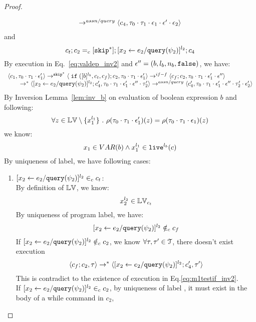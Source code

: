 {\begin{proof}
\begin{subproof}
\[\begin{array}{l}
  \rightarrow^{assn/query} 
  \langle {c}_4,  \mathtt{\tau}_0 \cdot \mathtt{\tau}_1 \cdot \mathtt{\epsilon}_1 \cdot \mathtt{\epsilon}' \cdot \mathtt{\epsilon}_2 \rangle 
  \end{array}
\]
and 
\[
  c_t;c_2 =_c [\mathtt{skip}^*]; [\mathrel{ {x}_2 \leftarrow e_2 / {\tt query}(\psi_2) }]^{l_2};{c}_4
\]
%
By execution in Eq.~\ref{eq:valdep_inv2} and $\mathtt{\epsilon}'' = (b, l_b, n_b, \mathtt{false})$, we have:
\begin{equation}
\label{eq:m1testif_inv2}
  \begin{array}{l}   
  \langle c_1, \mathtt{\tau}_0 \cdot \mathtt{\tau}_1 \cdot \mathtt{\epsilon}_1' \rangle 
  \rightarrow^{\mathtt{skip}^*} 
  \langle \;\mathtt{if}\; ([b]^{l_b}, c_t, c_f); {c}_2, \mathtt{\tau}_0 \cdot \mathtt{\tau}_1 \cdot \mathtt{\epsilon}_1' \rangle 
  \rightarrow^{if-f} 
  \langle c_f;c_2, \mathtt{\tau}_0 \cdot \mathtt{\tau}_1 \cdot \mathtt{\epsilon}_1' \cdot \mathtt{\epsilon}'' \rangle 
  \\
  \qquad \rightarrow^{*} 
  \langle [\mathrel{ {x}_2 \leftarrow e_2 / {\tt query}(\psi_2) }]^{l_2};{c}_4', 
  \mathtt{\tau}_0 \cdot \mathtt{\tau}_1 \cdot \mathtt{\epsilon}_1' \cdot \mathtt{\epsilon}'' \cdot \mathtt{\tau}_2' \rangle
  \rightarrow^{assn/query} 
  \langle {c}_4',  \mathtt{\tau}_0 \cdot \mathtt{\tau}_1 \cdot \mathtt{\epsilon}_1' \cdot \mathtt{\epsilon}'' \cdot \mathtt{\tau}_2' \cdot \mathtt{\epsilon}_2' \rangle 
\end{array}
\end{equation}
By Inversion Lemma~\ref{lem:inv_b} on evaluation of boolean expression $b$ and following: 
\[
  \forall z \in \mathbb{LV} \setminus \{x_1^{l_1}\} ~.~
  \rho(\mathtt{\tau}_0 \cdot \mathtt{\tau}_1 \cdot \mathtt{\epsilon}_1')(z) = \rho(\mathtt{\tau}_0 \cdot \mathtt{\tau}_1 \cdot \mathtt{\epsilon}_1)(z)
\]
we know:
\[
  x_1 \in VAR(b) \land x_1^{l_1} \in \mathtt{live}^{l_b}(c)
\]
%
 By uniqueness of label, we have following cases:
 \begin{enumerate}
 \item $[\mathrel{ {x}_2 \leftarrow e_2 / {\tt query}(\psi_2) }]^{l_2} \in_c c_t$:
\\
By definition of $\mathbb{LV}$, we know:
\[
  x_2^{l_2} \in \mathbb{LV}_{c_t}
\]
%
 By uniqueness of program label, we have:
 \[
 [\mathrel{ {x}_2 \leftarrow e_2 / {\tt query}(\psi_2) }]^{l_2} \notin_c c_f
 \]
 If $[\mathrel{ {x}_2 \leftarrow e_2 / {\tt query}(\psi_2) }]^{l_2} \notin_c c_2$,
we know $\forall \mathtt{\tau}, \mathtt{\tau}' \in \mathcal{T}$, there doesn't exist execution
 \[
  \langle c_f;c_2, \mathtt{\tau} \rangle \rightarrow^{*} 
  \langle [\mathrel{ {x}_2 \leftarrow e_2 / {\tt query}(\psi_2) }]^{l_2};{c}_4', \mathtt{\tau}' \rangle
 \]
 This is contradict to the existence of execution in Eq.\ref{eq:m1testif_inv2}.
 \\
 If $[\mathrel{ {x}_2 \leftarrow e_2 / {\tt query}(\psi_2) }]^{l_2} \in_c c_2$, 
 by uniqueness of label , 
 it must exist in the body of a while command in $c_2$,

\end{enumerate}
\end{subproof}
\end{proof}}
